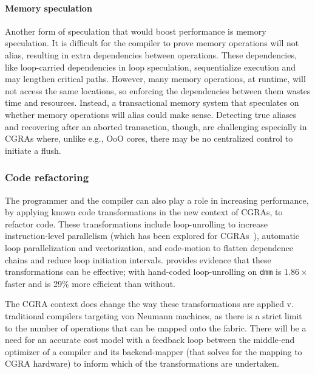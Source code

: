 \paragraph{Memory speculation}
Another form of speculation that would boost performance is memory speculation.
% 
% 
It is difficult for the compiler to prove memory operations will not alias, resulting in extra dependencies between operations.
% 
These dependencies, like loop-carried dependencies in loop speculation, sequentialize execution and may lengthen critical paths.
% 
However, many memory operations, at runtime, will not access the same locations,  so enforcing the dependencies between them wastes time and resources.
% 
Instead, a transactional memory system that speculates on whether memory operations will alias could make sense.
% 
Detecting true aliases and recovering after an aborted transaction, though, are challenging especially in CGRAs where, unlike e.g., OoO cores, there may be no centralized control to initiate a flush.

\subsubsection{Code refactoring}
The programmer and the compiler can also play a role in increasing performance, by applying known code transformations in the new context of CGRAs, to refactor code.
% 
These transformations include loop-unrolling to increase instruction-level parallelism (which has been explored for CGRAs~\cite{karunaratne2017hycube}), automatic loop parallelization and vectorization, and code-motion to flatten dependence chains and reduce loop initiation intervals.
% 
\riptide provides evidence that these transformations can be effective; \riptide with hand-coded loop-unrolling on {\tt dmm} is $1.86\times$ faster and is 29\% more efficient than without.
% 

The CGRA context does change the way these transformations are applied v. traditional compilers targeting von Neumann machines, as there is a strict limit to the number of operations that can be mapped onto the fabric.
% 
There will be a need for an accurate cost model with a feedback loop between the middle-end optimizer of a compiler and its backend-mapper (that solves for the mapping to CGRA hardware) to inform which of the transformations are undertaken.
% 
% 

